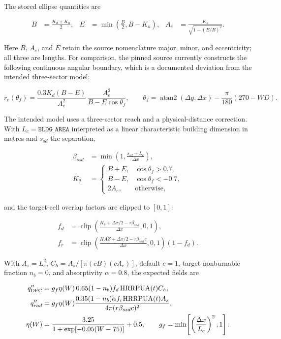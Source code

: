 The stored ellipse quantities are

\begin{align}
 B &= \frac{K_d+K_u}{2}, &
 E &= \min\left(\frac{B}{2},B-K_u\right), &
 A_e &= \frac{K_s}{\sqrt{1-(E/B)^2}}.
\end{align}

Here $B$, $A_e$, and $E$ retain the source nomenclature major,
minor, and eccentricity; all three are lengths.  For comparison, the pinned
source currently constructs the following continuous angular boundary, which
is a documented deviation from the intended three-sector model:

\begin{equation}
 r_e(\theta_f)=
 \frac{0.3K_d(B-E)}{A_e^2}\,
 \frac{A_e^2}{B-E\cos\theta_f},
 \qquad \theta_f=\operatorname{atan2}(\Delta y,\Delta x)
                  -\frac{\pi}{180}(270-WD).
\end{equation}

The intended model uses a three-sector reach and a physical-distance
correction.  With $L_c=\texttt{BLDG\_AREA}$ interpreted as a linear
characteristic building dimension in metres and $s_{sd}$ the separation,

\begin{align}
 \beta_{ssd}&=\min\!\left(1,\frac{s_{sd}+L_c}{\Delta x}\right),\\
 K_\theta&=\begin{cases}B+E,&\cos\theta_f>0.7,\\B-E,&\cos\theta_f<-0.7,\\2A_e,&\text{otherwise},\end{cases}
\end{align}

and the target-cell overlap factors are clipped to $[0,1]$:

\begin{align}
 f_d &= \operatorname{clip}\!\left(
       \frac{K_\theta+\Delta x/2-r\beta_{ssd}}{\Delta x},0,1\right),\\
 f_r &= \operatorname{clip}\!\left(
       \frac{HAZ+\Delta x/2-r\beta_{ssd}c}{\Delta x},0,1\right)(1-f_d).
\end{align}

With $A_s=L_c^2$, $C_h=A_s/[\pi(cB)(cA_e)]$, default $c=1$, target
nonburnable fraction $n_b=0$, and absorptivity $\alpha=0.8$, the expected
fields are

\begin{align}
 q''_{\mathrm{DFC}} &= g_f\eta(W)\,0.65(1-n_b)f_d\,\mathrm{HRRPUA}(t)C_h,\\
 q''_{rad} &= g_f\eta(W)\frac{0.35(1-n_b)\alpha f_r\mathrm{HRRPUA}(t)A_s}
                         {4\pi (r\beta_{ssd}c)^2},\\
 \eta(W)&=\frac{3.25}{1+\exp[-0.05(W-75)]}+0.5,\qquad
 g_f=\min\!\left[\left(\frac{\Delta x}{L_c}\right)^2,1\right].
\end{align}

